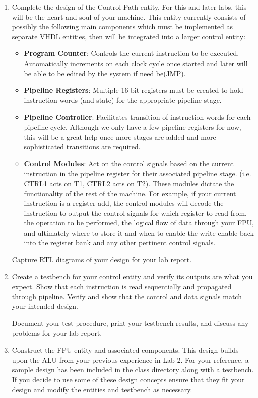 \documentclass{article}
\begin{document}
\begin{enumerate}
  \item Complete the design of the Control Path entity. For this and later labs, this will be the heart and soul of your machine. This entity currently consists of possibly the following main components which must be implemented as separate VHDL entities, then will be integrated into a larger control entity:
  \begin{itemize}
    \item \textbf{Program Counter}: Controls the current instruction to be executed. Automatically increments on each clock cycle once started and later will be able to be edited by the system if need be(JMP).
    \item \textbf{Pipeline Registers}: Multiple 16-bit registers must be created to hold instruction words (and state) for the appropriate pipeline stage.
    \item \textbf{Pipeline Controller}: Facilitates transition of instruction words for each pipeline cycle. Although we only have a few pipeline registers for now, this will be a great help once more stages are added and more sophisticated transitions are required.
    \item \textbf{Control Modules}: Act on the control signals based on the current instruction in the pipeline register for their associated pipeline stage. (i.e. CTRL1 acts on T1, CTRL2 acts on T2). These modules dictate the functionality of the rest of the machine. For example, if your current instruction is a register add, the control modules will decode the instruction to output the control signals for which register to read from, the operation to be performed, the logical flow of data through your FPU, and ultimately where to store it and when to enable the write enable back into the register bank and any other pertinent control signals.
  \end{itemize}
  Capture RTL diagrams of your design for your lab report.

  \item Create a testbench for your control entity and verify its outputs are what you expect. Show that each instruction is read sequentially and propagated through pipeline. Verify and show that the control and data signals match your intended design.
  
  Document your test procedure, print your testbench results, and discuss any problems for your lab report.

  \item Construct the FPU entity and associated components. This design builds upon the ALU from your previous experience in Lab 2. For your reference, a sample design has been included in the class directory along with a testbench. If you decide to use some of these design concepts ensure that they fit your design and modify the entities and testbench as necessary.
  

\end{enumerate}
\end{document}
